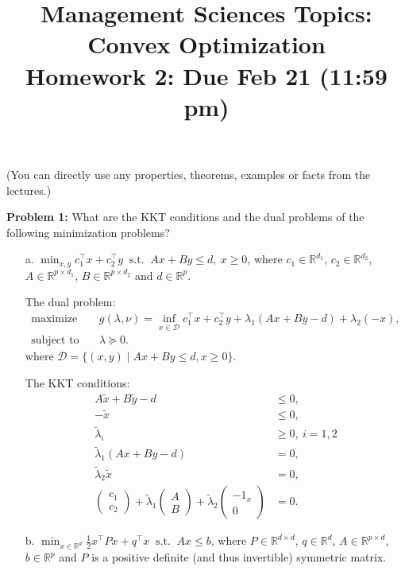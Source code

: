 \documentclass{article}
\begin{document}
\title{Management Sciences Topics: Convex Optimization\\ Homework 2: Due Feb 21 (11:59 pm) }
\date{}

\maketitle
\noindent(You can directly use any properties, theorems, examples or facts from the lectures.)
\bigskip

\noindent\textbf{Problem 1:}  What are the KKT conditions and the dual problems of the following minimization problems?
\begin{enumerate}
\item[a.] $\min_{x,y} c_1^\top x+c_2^\top y~\text{ s.t. }~Ax+By\leq d,~x\geq0$, where $c_1\in\mathbb{R}^{d_1}$, $c_2\in\mathbb{R}^{d_2}$, $A\in\mathbb{R}^{p\times d_1}$, $B\in\mathbb{R}^{p\times d_2}$ and $d\in\mathbb{R}^p$.

The dual problem:
$$
\begin{aligned}
\text{maximize}\quad &g(\lambda, \nu) = \inf_{x\in \mathcal{D}} c_1^\top x + c_2^\top y +  \lambda_1(Ax+By-d) +\lambda_2(-x),
\\
\text{subject to}\quad &\lambda\succeq 0.
\end{aligned}
$$
where $\mathcal{D} = \{(x, y)\mid Ax+By \le d, x\ge 0\}$.

The KKT conditions:
$$
\begin{aligned}
A\tilde{x}+B\tilde{y}-d &\le 0, \\
-\tilde{x} &\le 0, \\
\tilde\lambda_i &\ge 0, \ i = 1, 2 \\
\tilde\lambda_1(Ax+By-d) &= 0, \\
\tilde\lambda_2 \tilde{x} &= 0, \\
\begin{pmatrix}
c_1 \\ c_2
\end{pmatrix}
+
\tilde\lambda_1
\begin{pmatrix}
A \\ B
\end{pmatrix}
+\tilde\lambda_2
\begin{pmatrix}
-1_x \\ 0
\end{pmatrix}
&= 0.
\end{aligned}
$$

\item[b.] $\min_{x\in\mathbb{R}^d}\frac{1}{2}x^\top Px+q^\top x ~\text{ s.t. }~Ax\leq b$, where $P\in\mathbb{R}^{d\times d}$, $q\in\mathbb{R}^d$, $A\in\mathbb{R}^{p\times d}$, $b\in\mathbb{R}^p$ and $P$ is a positive definite (and thus invertible) symmetric matrix.


\end{enumerate}
\end{document}
